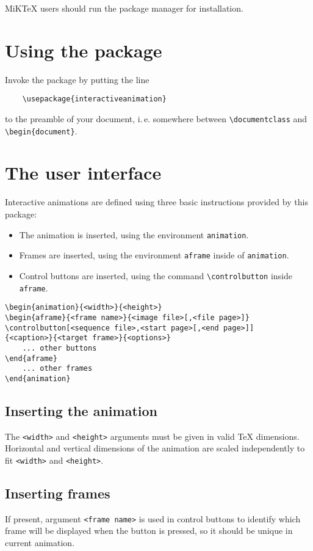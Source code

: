 \documentclass[a4paper,12pt]{article}
\begin{document}
MiK\TeX{} users should run the package manager for installation.

\section{Using the package}
Invoke the package by putting the line
\begin{verbatim}
    \usepackage{interactiveanimation}
\end{verbatim}
to the preamble of your document, i.\,e. somewhere between \verb+\documentclass+ and \verb+\begin{document}+.

\section{The user interface}
Interactive animations are defined using three basic instructions provided by this package:
\begin{itemize}
\item The animation is inserted, using the environment \verb+animation+.
\item Frames are inserted, using the environment \verb+aframe+ inside of \verb+animation+.
\item Control buttons are inserted, using the command \verb+\controlbutton+ inside \verb+aframe+.
\end{itemize}

\begin{verbatim}
\begin{animation}{<width>}{<height>}
\begin{aframe}{<frame name>}{<image file>[,<file page>]}
\controlbutton[<sequence file>,<start page>[,<end page>]]
{<caption>}{<target frame>}{<options>}
    ... other buttons
\end{aframe}
    ... other frames
\end{animation}
\end{verbatim}

\subsection{Inserting the animation}
The \verb+<width>+ and \verb+<height>+ arguments must be given in valid \TeX{} dimensions. Horizontal and vertical dimensions of the animation are scaled independently to fit \verb+<width>+ and \verb+<height>+.

\subsection{Inserting frames}
If present, argument \verb+<frame name>+ is used in control buttons to identify which frame will be displayed when the button is pressed, so it should be unique in current animation.
\end{document}
